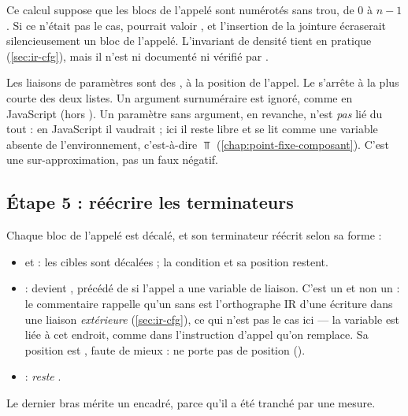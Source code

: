 \begin{piege}
Ce calcul suppose que les blocs de l'appelé sont numérotés sans trou, de 0 à $n-1$. Si ce n'était pas le cas,  pourrait valoir , et l'insertion de la jointure écraserait silencieusement un bloc de l'appelé. L'invariant de densité tient en pratique (\cref{sec:ir-cfg}), mais il n'est ni documenté ni vérifié par .
\end{piege}

Les liaisons de paramètres sont des , à la position de l'appel. Le  s'arrête à la plus courte des deux listes. Un argument surnuméraire est ignoré, comme en JavaScript (hors ). Un paramètre sans argument, en revanche, n'est \emph{pas} lié du tout : en JavaScript il vaudrait  ; ici il reste libre et se lit comme une variable absente de l'environnement, c'est-à-dire $\Top$ (\cref{chap:point-fixe-composant}). C'est une sur-approximation, pas un faux négatif.

\subsection{Étape 5 : réécrire les terminateurs}


Chaque bloc de l'appelé est décalé, et son terminateur réécrit selon sa forme :
\begin{itemize}
  \item {} et  : les cibles sont décalées ; la condition et sa position restent.
  \item {} : devient , précédé de  si l'appel a une variable de liaison. C'est un  et non un  : le commentaire rappelle qu'un  sans  est l'orthographe IR d'une écriture dans une liaison \emph{extérieure} (\cref{sec:ir-cfg}), ce qui n'est pas le cas ici --- la variable est liée à cet endroit, comme dans l'instruction d'appel qu'on remplace. Sa position est , faute de mieux :  ne porte pas de position ().
  \item {} : \emph{reste} .
\end{itemize}

Le dernier bras mérite un encadré, parce qu'il a été tranché par une mesure.

